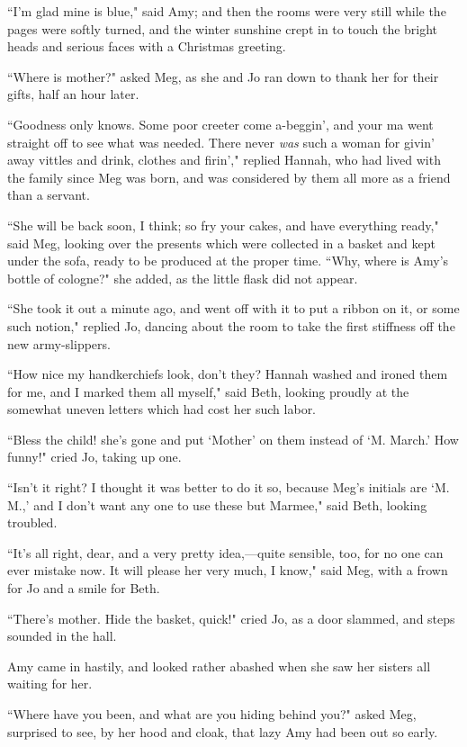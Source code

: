 ``I'm glad mine is blue," said Amy; and then the rooms
were very still while the pages were softly turned, and the winter
sunshine crept in to touch the bright heads and serious faces with a
Christmas greeting.

``Where is mother?" asked Meg, as she and Jo ran down to thank her for
their gifts, half an hour later.

``Goodness only knows. Some poor creeter come a-beggin',
and your ma went straight off to see what was needed. There never
\emph{was} such a woman for givin' away vittles and
drink, clothes and firin'," replied Hannah, who had lived
with the family since Meg was born, and was considered by them all more
as a friend than a servant.

``She will be back soon, I think; so fry your cakes, and have everything
ready," said Meg, looking over the presents which were collected in a
basket and kept under the sofa, ready to be produced at the proper time.
``Why, where is Amy's bottle of cologne?" she added, as
the little flask did not appear.

``She took it out a minute ago, and went off with it to put a ribbon on
it, or some such notion," replied Jo, dancing about the room to take the
first stiffness off the new army-slippers.

``How nice my handkerchiefs look, don't they? Hannah
washed and ironed them for me, and I marked them all myself," said Beth,
looking proudly at the somewhat uneven letters which had cost her such
labor.

``Bless the child! she's gone and put
`Mother' on them instead of
`M. March.' How funny!" cried Jo,
taking up one.

``Isn't it right? I thought it was better to do it so,
because Meg's initials are `M.
M.,' and I don't want any one to use
these but Marmee," said Beth, looking troubled.

``It's all right, dear, and a very pretty idea,---quite
sensible, too, for no one can ever mistake now. It will please her very
much, I know," said Meg, with a frown for Jo and a smile for Beth.

``There's mother. Hide the basket, quick!" cried Jo, as a
door slammed, and steps sounded in the hall.

Amy came in hastily, and looked rather abashed when she saw her sisters
all waiting for her.

``Where have you been, and what are you hiding behind you?" asked Meg,
surprised to see, by her hood and cloak, that lazy Amy had been out so
early.

